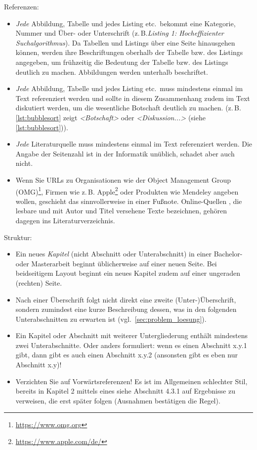 \documentclass[11pt]{scrartcl}
\newcommand{\qto}[1]{\glqq #1\grqq}				%
\newcommand{\zB}{\mbox{z.\,B.}\xspace}
\newcommand{\bzw}{bzw.\xspace}
\begin{document}
\noindent
Referenzen:	
	\begin{itemize}
		\item \emph{Jede} Abbildung, Tabelle und jedes Listing etc.\ bekommt eine Kategorie, Nummer und Über- oder Unterschrift (\zB \emph{Listing 1: Hocheffizienter Suchalgorithmus}). 
		Da Tabellen und Listings über eine Seite hinausgehen können, werden ihre Beschriftungen oberhalb der Tabelle \bzw des Listings angegeben, um frühzeitig die Bedeutung der Tabelle \bzw des Listings deutlich zu machen. Abbildungen werden unterhalb beschriftet.
		\item \emph{Jede} Abbildung, Tabelle und jedes Listing etc.\ muss mindestens einmal im Text referenziert werden und sollte in diesem Zusammenhang zudem im Text diskutiert werden, um die wesentliche Botschaft deutlich zu machen. (\zB \qto{\cref{lst:bubblesort} zeigt \emph{<Botschaft>}} oder \qto{\emph{<Diskussion...>} (siehe \cref{lst:bubblesort})}). 
		\item \emph{Jede} Literaturquelle muss mindestens einmal im Text referenziert werden. Die Angabe der Seitenzahl ist in der Informatik unüblich, schadet aber auch nicht.
		\item Wenn Sie URLs zu Organisationen wie der Object Management Group (OMG)\footnote{\url{https://www.omg.org}}, Firmen wie \zB Apple\footnote{\url{https://www.apple.com/de/}} oder Produkten wie Mendeley angeben wollen, geschieht das sinnvollerweise in einer Fußnote. Online-Quellen \cite{lit:Gossman:MVVM}, die \qto{lesbare} und mit Autor und Titel versehene Texte bezeichnen, gehören dagegen ins Literaturverzeichnis.
	\end{itemize}
	



\noindent
Struktur:
	\begin{itemize}
	 	\item Ein neues \emph{Kapitel} (nicht Abschnitt oder Unterabschnitt) in einer Bachelor- oder Masterarbeit beginnt üblicherweise auf einer neuen Seite. Bei beidseitigem Layout beginnt ein neues Kapitel zudem auf einer ungeraden (rechten) Seite.
	 	\item Nach einer Überschrift folgt nicht direkt eine zweite (Unter-)Überschrift, sondern zumindest eine kurze Beschreibung dessen, was in den folgenden Unterabschnitten zu erwarten ist (vgl.~\cref{sec:problem_loesung}).
	 	\item Ein Kapitel oder Abschnitt mit weiterer Untergliederung enthält mindestens zwei Unterabschnitte. Oder anders formuliert: wenn es einen Abschnitt x.y.1 gibt, dann gibt es auch einen Abschnitt x.y.2 (ansonsten gibt es eben nur Abschnitt x.y)!
	 	\item Verzichten Sie auf Vorwärtsreferenzen! Es ist im Allgemeinen schlechter Stil, bereits in Kapitel 2 mittels eines \qto{siehe Abschnitt 4.3.1} auf Ergebnisse zu verweisen, die erst später folgen (Ausnahmen bestätigen die Regel).
	\end{itemize}
\end{document}
